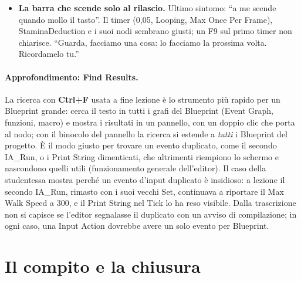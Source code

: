 \begin{itemize}
        sistemati, ma la corsa non riparte. Allora una prova diretta: un \textbf{Event
        Tick} con un Print String di \textbf{Get Max Walk Speed} dal Character Movement.
        ``Il problema è che ce n'hai troppi di Print String'': con \textbf{Ctrl+F}
        (\emph{Find Results}) si cercano tutti i Print String del Blueprint, con un doppio
        clic si va a ciascuno e si tolgono quelli vecchi. Il valore stampato è
        ``300, 300, 300, sempre 300, anche se tengo premuto''. Un'altra ricerca, ``Max
        Walk Speed'', scopre il colpevole: un \emph{secondo} evento IA\_Run, rimasto dalla
        lezione precedente, con i suoi Set. ``Questo lo devi levare'', ``leva tutto questo
        ambaradam''. Ora corre.
  \item \textbf{La barra che scende solo al rilascio.} Ultimo sintomo: ``a me scende quando
        mollo il tasto''. Il timer (0,05, Looping, Max Once Per Frame), StaminaDeduction e
        i suoi nodi sembrano giusti; un F9 sul primo timer non chiarisce. ``Guarda, facciamo
        una cosa: lo facciamo la prossima volta. Ricordamelo tu.''
\end{itemize}

\paragraph{Approfondimento: Find Results.} La ricerca con \textbf{Ctrl+F} usata a fine
lezione è lo strumento più rapido per un Blueprint grande: cerca il testo in tutti i grafi
del Blueprint (Event Graph, funzioni, macro) e mostra i risultati in un pannello, con un
doppio clic che porta al nodo; con il binocolo del pannello la ricerca si estende a
\emph{tutti} i Blueprint del progetto. È il modo giusto per trovare un evento duplicato,
come il secondo IA\_Run, o i Print String dimenticati, che altrimenti riempiono lo schermo
e nascondono quelli utili (funzionamento generale dell'editor). Il caso della studentessa
mostra perché un evento d'input duplicato è insidioso: a lezione il secondo IA\_Run,
rimasto con i suoi vecchi Set, continuava a riportare il Max Walk Speed a 300, e il Print
String nel Tick lo ha reso visibile. Dalla trascrizione non si capisce se l'editor
segnalasse il duplicato con un avviso di compilazione; in ogni caso, una Input Action
dovrebbe avere un solo evento per Blueprint.

\section{Il compito e la chiusura}
\label{ue11:sec:chiusura}

